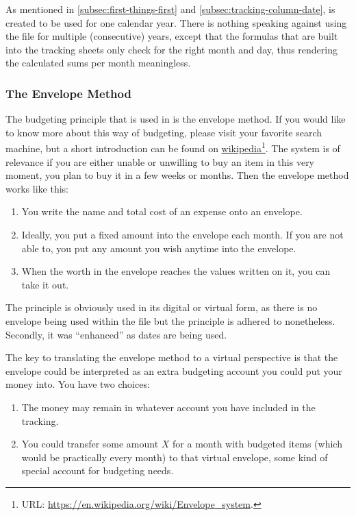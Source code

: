 As mentioned in \autoref{subsec:first-things-first} and \autoref{subsec:tracking-column-date}, \tfn is created to be used for one calendar year.
There is nothing speaking against using the file for multiple (consecutive) years, except that the formulas that are built into the tracking sheets only check for the right month and day, thus rendering the calculated sums per month meaningless.

\subsubsection{The Envelope Method}
\label{subsubsec:budgeting-the-envelope-method}

The budgeting principle that is used in \tfn is the envelope method.
If you would like to know more about this way of budgeting, please visit your favorite search machine, but a short introduction can be found on \href{https://en.wikipedia.org/wiki/Envelope_system}{wikipedia}\footnote{URL: \href{https://en.wikipedia.org/wiki/Envelope_system}{https://en.wikipedia.org/wiki/Envelope{\_}system}.}.
The system is of relevance if you are either unable or unwilling to buy an item in this very moment, \ie you plan to buy it in a few weeks or months.
Then the envelope method works like this:
\begin{enumerate}
	\item You write the name and total cost of an expense onto an envelope.
	\item Ideally, you put a fixed amount into the envelope each month.
	If you are not able to, you put any amount you wish anytime into the envelope.
	\item When the worth in the envelope reaches the values written on it, you can take it out.
\end{enumerate}

The principle is obviously used in its digital or virtual form, as there is no envelope being used within the file but the principle is adhered to nonetheless.
Secondly, it was ``enhanced'' as dates are being used.

The key to translating the envelope method to a virtual perspective is that the envelope could be interpreted as an extra budgeting account you could put your money into.
You have two choices:
\begin{enumerate}
	\item The money may remain in whatever account you have included in the tracking.
	\item You could transfer some amount \( X \) for a month with budgeted items (which would be practically every month) to that virtual envelope, \ie some kind of special account for budgeting needs.
\end{enumerate}

